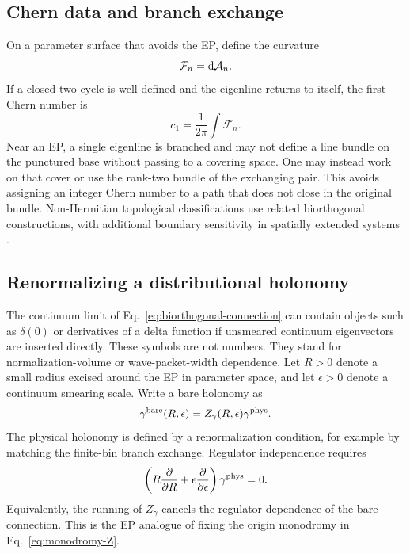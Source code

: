 \subsection{Chern data and branch exchange}
\label{subsec:chern-branch}

On a parameter surface that avoids the EP, define the curvature
\begin{equation}
  \mathcal F_n=\mathrm{d}\mathcal A_n .
  \label{eq:berry-curvature}
\end{equation}
If a closed two-cycle is well defined and the eigenline returns to itself, the
first Chern number is
\begin{equation}
  c_1=\frac{1}{2\pi}
  \int\mathcal F_n .
  \label{eq:first-chern}
\end{equation}
Near an EP, a single eigenline is branched and may not define a line bundle on
the punctured base without passing to a covering space.  One may instead work
on that cover or use the rank-two bundle of the exchanging pair.  This avoids
assigning an integer Chern number to a path that does not close in the original
bundle.  Non-Hermitian topological classifications use related biorthogonal
constructions, with additional boundary sensitivity in spatially extended
systems
\cite{Gong2018Topological,Yao2018EdgeStates,Alase:2016tqv}.

\subsection{Renormalizing a distributional holonomy}
\label{subsec:holonomy-renormalization}

The continuum limit of Eq.~\eqref{eq:biorthogonal-connection} can contain
objects such as $\delta(0)$ or derivatives of a delta function if unsmeared
continuum eigenvectors are inserted directly.  These symbols are not numbers.
They stand for normalization-volume or wave-packet-width dependence.  Let
$R>0$ denote a small radius excised around the EP in parameter space, and let
$\epsilon>0$ denote a continuum smearing scale.  Write a bare holonomy as
\begin{equation}
  \gamma^{\mathrm{bare}}(R,\epsilon)
  =Z_{\gamma}(R,\epsilon)
  \gamma^{\mathrm{phys}} .
  \label{eq:holonomy-Z}
\end{equation}
The physical holonomy is defined by a renormalization condition, for example
by matching the finite-bin branch exchange.  Regulator independence requires
\begin{equation}
  \left(
  R\frac{\partial}{\partial R}
  +\epsilon\frac{\partial}{\partial\epsilon}
  \right)
  \gamma^{\mathrm{phys}}=0 .
  \label{eq:holonomy-rg-invariance}
\end{equation}
Equivalently, the running of $Z_\gamma$ cancels the regulator dependence of the
bare connection.  This is the EP analogue of fixing the origin monodromy in
Eq.~\eqref{eq:monodromy-Z}.


